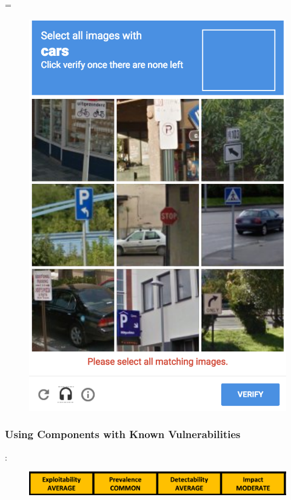 =    
    \begin{figure}[h]
    	\centering
    	\includegraphics[scale=0.44,center]{chapters/chapter03/figures/verifyGoogle.png}
        \label{ArtemisSelfXSS}
    \end{figure}  
    

    
    
    \newpage
            

    \subsubsection{Using Components with Known Vulnerabilities}:
    
    \begin{figure}[h]
    	\centering
    	\includegraphics[scale=0.5,center]{chapters/chapter03/figures/components.png}
    	\label{vulnerable}
    \end{figure}
    
